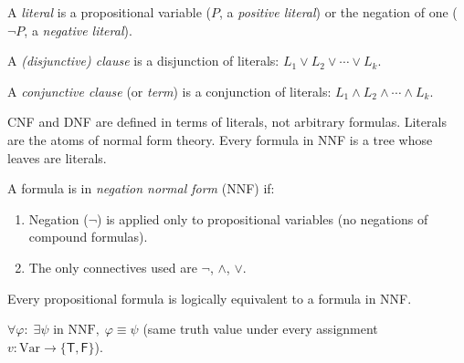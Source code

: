 \begin{tcolorbox}[colback=propbox, colframe=propborder, arc=2pt,
  left=6pt, right=6pt, top=4pt, bottom=4pt,
  title={\small\textbf{Definitions (Literal and Clause)}},
  fonttitle=\small\bfseries]
\label{def:literal}
A \emph{literal} is a propositional variable ($P$, a \emph{positive literal})
or the negation of one ($\neg P$, a \emph{negative literal}).

\label{def:clause}
A \emph{(disjunctive) clause} is a disjunction of literals:
$L_1 \vee L_2 \vee \cdots \vee L_k$.

A \emph{conjunctive clause} (or \emph{term}) is a conjunction of literals:
$L_1 \wedge L_2 \wedge \cdots \wedge L_k$.
\end{tcolorbox}

\begin{remark}
CNF and DNF are defined in terms of literals, not arbitrary formulas. Literals
are the atoms of normal form theory. Every formula in NNF is a tree whose
leaves are literals.
\end{remark}

\begin{tcolorbox}[colback=propbox, colframe=propborder, arc=2pt,
  left=6pt, right=6pt, top=4pt, bottom=4pt,
  title={\small\textbf{Definition (Negation Normal Form — NNF)}},
  fonttitle=\small\bfseries]
\label{def:nnf}
A formula is in \emph{negation normal form} (NNF) if:
\begin{enumerate}
  \item Negation ($\neg$) is applied only to propositional variables (no negations of compound formulas).
  \item The only connectives used are $\neg$, $\wedge$, $\vee$.
\end{enumerate}
\end{tcolorbox}

\begin{proposition}
\label{prop:nnf-exists}
Every propositional formula is logically equivalent to a formula in NNF.
\end{proposition}

\begin{remark*}
$\forall\varphi:\; \exists\psi \text{ in NNF},\; \varphi \equiv \psi$ (same truth value under every assignment $v: \mathrm{Var}\to\{\mathsf{T},\mathsf{F}\}$).
\end{remark*}


